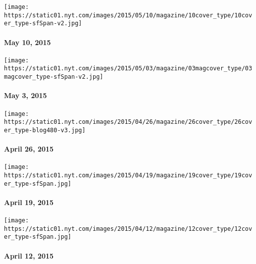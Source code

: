 \href{http://www.nytimes.com/indexes/2015/05/10/magazine/index.html}{}

\texttt{[image: https://static01.nyt.com/images/2015/05/10/magazine/10cover\_type/10cover\_type-sfSpan-v2.jpg]}

\hypertarget{may-10-2015}{%
\paragraph{May 10, 2015}\label{may-10-2015}}

\href{http://www.nytimes.com/indexes/2015/05/03/magazine/index.html}{}

\texttt{[image: https://static01.nyt.com/images/2015/05/03/magazine/03magcover\_type/03magcover\_type-sfSpan-v2.jpg]}

\hypertarget{may-3-2015}{%
\paragraph{May 3, 2015}\label{may-3-2015}}

\href{http://www.nytimes.com/indexes/2015/04/26/magazine/index.html}{}

\texttt{[image: https://static01.nyt.com/images/2015/04/26/magazine/26cover\_type/26cover\_type-blog480-v3.jpg]}

\hypertarget{april-26-2015}{%
\paragraph{April 26, 2015}\label{april-26-2015}}

\href{http://www.nytimes.com/indexes/2015/04/19/magazine/index.html}{}

\texttt{[image: https://static01.nyt.com/images/2015/04/19/magazine/19cover\_type/19cover\_type-sfSpan.jpg]}

\hypertarget{april-19-2015}{%
\paragraph{April 19, 2015}\label{april-19-2015}}

\href{http://www.nytimes.com/indexes/2015/04/12/magazine/index.html}{}

\texttt{[image: https://static01.nyt.com/images/2015/04/12/magazine/12cover\_type/12cover\_type-sfSpan.jpg]}

\hypertarget{april-12-2015}{%
\paragraph{April 12, 2015}\label{april-12-2015}}

